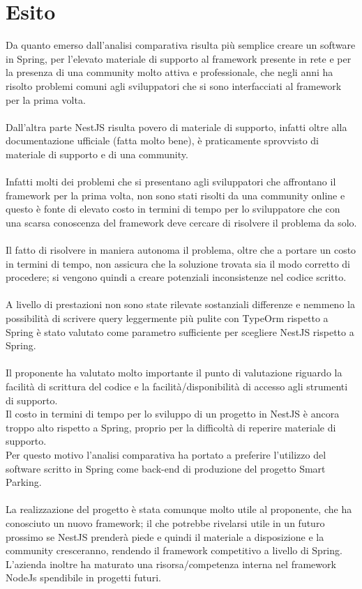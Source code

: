 \section{Esito}
Da quanto emerso dall'analisi comparativa risulta più semplice creare un software in Spring, per l'elevato materiale di
supporto al framework presente in rete e per la presenza di una community molto attiva e professionale, che negli
anni ha risolto problemi comuni agli sviluppatori che si sono interfacciati al framework per la prima volta. 
\\\\
Dall'altra parte NestJS risulta povero di materiale di supporto, infatti oltre alla documentazione ufficiale (fatta molto
bene), è praticamente sprovvisto di materiale di supporto e di una community.
\\\\
Infatti molti dei problemi che si presentano agli sviluppatori che affrontano il framework per la prima volta, non sono
stati risolti da una community online e questo è fonte di elevato costo in termini di tempo per lo sviluppatore che con 
una scarsa conoscenza del framework deve cercare di risolvere il problema da solo.
\\\\
Il fatto di risolvere in maniera autonoma il problema, oltre che a portare un costo in termini di tempo, non assicura 
che la soluzione trovata sia il modo corretto di procedere; si vengono quindi a creare potenziali inconsistenze nel codice
scritto.
\\\\
A livello di prestazioni non sono state rilevate sostanziali differenze e nemmeno la possibilità di scrivere query 
leggermente più pulite con TypeOrm rispetto a Spring è stato valutato come parametro sufficiente per scegliere 
NestJS rispetto a Spring.
\\\\
Il proponente ha valutato molto importante il punto di valutazione riguardo la facilità di scrittura del codice
e la facilità/disponibilità di accesso agli strumenti di supporto.
\\
Il costo in termini di tempo per lo sviluppo di un progetto in NestJS è ancora troppo alto rispetto a Spring, proprio
per la difficoltà di reperire materiale di supporto.
\\
Per questo motivo l'analisi comparativa ha portato a preferire l'utilizzo del software scritto in Spring come \gls{back-end}
di produzione del progetto Smart Parking.
\\\\
La realizzazione del progetto è stata comunque molto utile al proponente, che ha conosciuto un nuovo
framework; il che potrebbe rivelarsi utile in un futuro prossimo se NestJS prenderà piede e quindi il materiale a 
disposizione e la community cresceranno, rendendo il framework competitivo a livello di Spring.
\\
L'azienda inoltre ha maturato una risorsa/competenza interna nel framework NodeJs spendibile
in progetti futuri. 